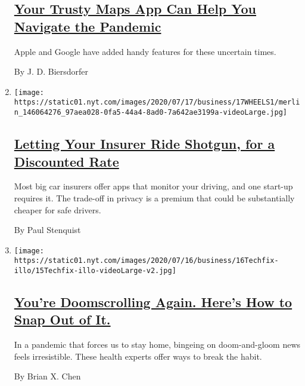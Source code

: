 \begin{enumerate}
  \hypertarget{your-trusty-maps-app-can-help-you-navigate-the-pandemic}{%
  \subsection{\texorpdfstring{\href{/2020/07/22/technology/personaltech/maps-apps-coronavirus-pandemic.html}{Your
  Trusty Maps App Can Help You Navigate the
  Pandemic}}{Your Trusty Maps App Can Help You Navigate the Pandemic}}\label{your-trusty-maps-app-can-help-you-navigate-the-pandemic}}

  Apple and Google have added handy features for these uncertain times.

  By J. D. Biersdorfer
\item
  \texttt{[image: https://static01.nyt.com/images/2020/07/17/business/17WHEELS1/merlin\_146064276\_97aea028-0fa5-44a4-8ad0-7a642ae3199a-videoLarge.jpg]}

  \hypertarget{letting-your-insurer-ride-shotgun-for-a-discounted-rate}{%
  \subsection{\texorpdfstring{\href{/2020/07/16/business/car-insurance-app-discounts.html}{Letting
  Your Insurer Ride Shotgun, for a Discounted
  Rate}}{Letting Your Insurer Ride Shotgun, for a Discounted Rate}}\label{letting-your-insurer-ride-shotgun-for-a-discounted-rate}}

  Most big car insurers offer apps that monitor your driving, and one
  start-up requires it. The trade-off in privacy is a premium that could
  be substantially cheaper for safe drivers.

  By Paul Stenquist
\item
  \texttt{[image: https://static01.nyt.com/images/2020/07/16/business/16Techfix-illo/15Techfix-illo-videoLarge-v2.jpg]}

  \hypertarget{youre-doomscrolling-again-heres-how-to-snap-out-of-it}{%
  \subsection{\texorpdfstring{\href{/2020/07/15/technology/personaltech/youre-doomscrolling-again-heres-how-to-snap-out-of-it.html}{You're
  Doomscrolling Again. Here's How to Snap Out of
  It.}}{You're Doomscrolling Again. Here's How to Snap Out of It.}}\label{youre-doomscrolling-again-heres-how-to-snap-out-of-it}}

  In a pandemic that forces us to stay home, bingeing on doom-and-gloom
  news feels irresistible. These health experts offer ways to break the
  habit.

  By Brian X. Chen
\end{enumerate}

